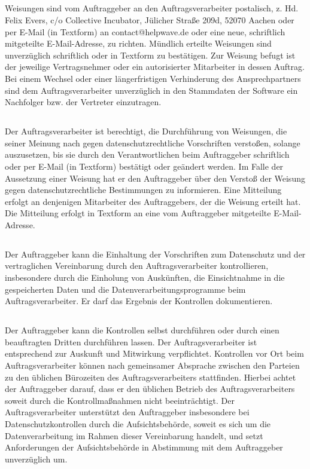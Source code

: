 \documentclass[10pt]{article}
\begin{document}
\subsection{} Weisungen sind vom Auftraggeber an den Auftragsverarbeiter postalisch, z. Hd.
Felix Evers, c/o Collective Incubator, Jülicher Straße 209d, 52070 Aachen oder per E-Mail (in Textform) an contact@helpwave.de oder
eine neue, schriftlich mitgeteilte E-Mail-Adresse, zu richten. Mündlich erteilte
Weisungen sind unverzüglich schriftlich oder in Textform zu bestätigen. Zur
Weisung befugt ist der jeweilige Vertragsnehmer oder ein autorisierter Mitarbeiter
in dessen Auftrag. Bei einem Wechsel oder einer längerfristigen Verhinderung des
Ansprechpartners sind dem Auftragsverarbeiter unverzüglich in den Stammdaten der
Software ein Nachfolger bzw. der Vertreter einzutragen.
\subsection{} Der Auftragsverarbeiter ist berechtigt, die Durchführung von Weisungen, die seiner
Meinung nach gegen datenschutzrechtliche Vorschriften verstoßen, solange
auszusetzen, bis sie durch den Verantwortlichen beim Auftraggeber schriftlich oder
per E-Mail (in Textform) bestätigt oder geändert werden. Im Falle der Aussetzung
einer Weisung hat er den Auftraggeber über den Verstoß der Weisung gegen
datenschutzrechtliche Bestimmungen zu informieren. Eine Mitteilung erfolgt an
denjenigen Mitarbeiter des Auftraggebers, der die Weisung erteilt hat. Die
Mitteilung erfolgt in Textform an eine vom Auftraggeber mitgeteilte E-Mail-Adresse.
\subsection{} Der Auftraggeber kann die Einhaltung der Vorschriften zum Datenschutz und der
vertraglichen Vereinbarung durch den Auftragsverarbeiter kontrollieren,
insbesondere durch die Einholung von Auskünften, die Einsichtnahme in die
gespeicherten Daten und die Datenverarbeitungsprogramme beim
Auftragsverarbeiter. Er darf das Ergebnis der Kontrollen dokumentieren.
\subsection{} Der Auftraggeber kann die Kontrollen selbst durchführen oder durch einen
beauftragten Dritten durchführen lassen. Der Auftragsverarbeiter ist entsprechend
zur Auskunft und Mitwirkung verpflichtet. Kontrollen vor Ort beim Auftragsverarbeiter können nach gemeinsamer Absprache zwischen den Parteien
zu den üblichen Bürozeiten des Auftragsverarbeiters stattfinden. Hierbei achtet der
Auftraggeber darauf, dass er den üblichen Betrieb des Auftragsverarbeiters soweit
durch die Kontrollmaßnahmen nicht beeinträchtigt. Der Auftragsverarbeiter
unterstützt den Auftraggeber insbesondere bei Datenschutzkontrollen durch die
Aufsichtsbehörde, soweit es sich um die Datenverarbeitung im Rahmen dieser
Vereinbarung handelt, und setzt Anforderungen der Aufsichtsbehörde in
Abstimmung mit dem Auftraggeber unverzüglich um.
\end{document}
